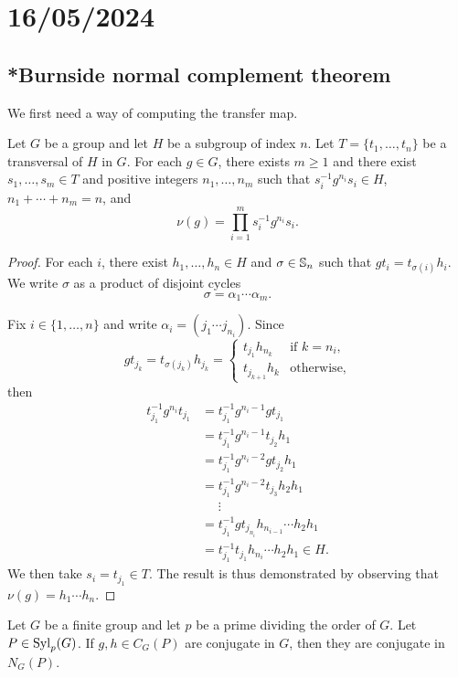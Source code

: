 \section{16/05/2024}

\subsection{*Burnside normal complement theorem}

We first need a way of computing the transfer map.

\begin{lemma}
	\label{lem:evaluation}
	Let $G$ be a group and let $H$ be a subgroup of index $n$. Let $T=\{t_1,\dots,t_n\}$ be a transversal of $H$ in $G$. For each $g \in G$, there exists $m\geq1$ and there exist $s_{1},\dots,s_{m} \in T$ and positive integers $n_1,\dots,n_m$ such that $s_i^{-1}g^{n_i}s_i \in H$, $n_1+\cdots+n_m=n$, and 
	\[
		\nu(g)=\prod_{i=1}^m s_i^{-1}g^{n_i}s_i.
	\]
\end{lemma}

\begin{proof}
	For each $i$, there exist $h_1,\dots,h_n\in H$ and $\sigma\in\mathbb{S}_n$ such that $gt_i=t_{\sigma(i)}h_i$. We write $\sigma$ as a product of disjoint cycles
	\[
		\sigma=\alpha_1\cdots\alpha_m.
	\]

	Fix $i\in\{1,\dots,n\}$ and write    
	$\alpha_i=(j_{1}\cdots j_{n_i})$. Since  
	\[
		g t_{j_k}=t_{\sigma(j_k)}h_{j_k}=\begin{cases}
			t_{j_1}h_{n_k} & \text{if $k=n_i$},\\
			t_{j_{k+1}}h_{k} & \text{otherwise},
		\end{cases}
	\]
	then 
	\begin{align*}
	t_{j_1}^{-1}g^{n_i}t_{j_1}
	&=t_{j_1}^{-1}g^{n_i-1}gt_{j_1}\\
	&=t_{j_1}^{-1}g^{n_i-1}t_{j_2}h_1\\
	&=t_{j_1}^{-1}g^{n_i-2}gt_{j_2}h_1\\
	&=t_{j_1}^{-1}g^{n_i-2}t_{j_3}h_2h_1\\
	&\phantom{=}\vdots\\
	&=t_{j_1}^{-1}gt_{j_{n_i}}h_{n_{i-1}}\cdots h_2h_1\\
	&=t_{j_1}^{-1}t_{j_1}h_{n_i}\cdots h_2h_1\in H. 	
	\end{align*}
	We then take $s_i=t_{j_1}\in T$. The result is thus demonstrated by observing that $\nu(g)=h_1\cdots h_n$. 
\end{proof}


\begin{lemma}
	\label{lem:normal_complement}
	Let $G$ be a finite group and let $p$ be a prime dividing the order of $G$. Let $P\in\mathrm{Syl}_p(G)$. If $g,h\in C_G(P)$ are conjugate in $G$, then they are conjugate in $N_G(P)$.
\end{lemma}

